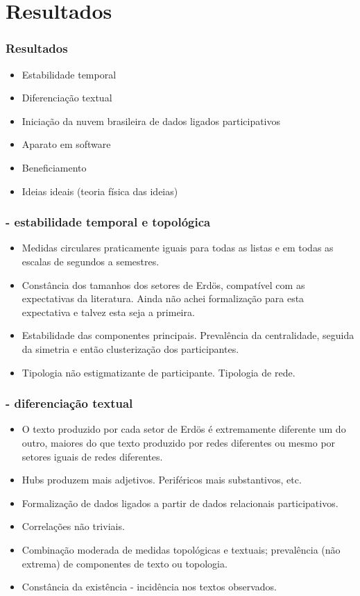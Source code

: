 \documentclass[10pt]{beamer}
\begin{document}
\section{Resultados}
\begin{frame}
\frametitle{Resultados}
\begin{itemize}
	\item Estabilidade temporal
	\item Diferenciação textual
	\item Iniciação da nuvem brasileira de dados ligados participativos
	\item Aparato em software
	\item Beneficiamento
	\item Ideias ideais (teoria física das ideias)
\end{itemize}
\end{frame}

\begin{frame}
\frametitle{- estabilidade temporal e topológica}
\begin{itemize}
	\item Medidas circulares praticamente iguais para todas as listas e em todas as escalas de segundos a semestres.
	\item Constância dos tamanhos dos setores de Erdös, compatível com as expectativas da literatura. Ainda não achei formalização para esta expectativa e talvez esta seja a primeira.
	\item Estabilidade das componentes principais. Prevalência da centralidade, seguida da simetria e então clusterização dos participantes.
	\item Tipologia não estigmatizante de participante. Tipologia de rede.
\end{itemize}
\end{frame}

\begin{frame}
\frametitle{- diferenciação textual}
\begin{itemize}
	\item O texto produzido por cada setor de Erdös é extremamente diferente um do outro, maiores do que texto produzido por redes diferentes ou mesmo por setores iguais de redes diferentes.
	\item Hubs produzem mais adjetivos. Periféricos mais substantivos, etc.
	\item Formalização de dados ligados a partir de dados relacionais participativos.
	\item Correlações não triviais.
	\item Combinação moderada de medidas topológicas e textuais; prevalência (não extrema) de componentes de texto ou topologia.
	\item Constância da existência - incidência nos textos observados.
\end{itemize}
\end{frame}
\end{document}
